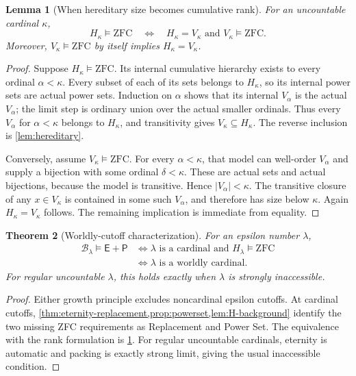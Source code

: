 \documentclass[11pt,letterpaper]{article}
\newtheorem{theorem}{Theorem}[section]
\newtheorem{lemma}[theorem]{Lemma}
\theoremstyle{definition}
\theoremstyle{remark}
\newcommand{\B}{\mathcal B}
\newcommand{\Etern}{\mathsf E}
\newcommand{\Pack}{\mathsf P}
\newcommand{\card}[1]{\lvert#1\rvert}
\begin{document}
\begin{lemma}[When hereditary size becomes cumulative rank]
\label{lem:worldly-HV}
For an uncountable cardinal $\kappa$,
\[
 H_\kappa\models\mathrm{ZFC}
 \quad\Longleftrightarrow\quad
 H_\kappa=V_\kappa\text{ and }V_\kappa\models\mathrm{ZFC}.
\]
Moreover, $V_\kappa\models\mathrm{ZFC}$ by itself implies
$H_\kappa=V_\kappa$.
\end{lemma}
\begin{proof}
Suppose $H_\kappa\models\mathrm{ZFC}$. Its internal cumulative hierarchy
exists to every ordinal $\alpha<\kappa$. Every subset of each of its sets
belongs to $H_\kappa$, so its internal power sets are actual power sets.
Induction on $\alpha$ shows that its internal $V_\alpha$ is the actual
$V_\alpha$; the limit step is ordinary union over the actual smaller
ordinals. Thus every $V_\alpha$ for $\alpha<\kappa$ belongs to $H_\kappa$,
and transitivity gives $V_\kappa\subseteq H_\kappa$.
The reverse inclusion is \cref{lem:hereditary}.

Conversely, assume $V_\kappa\models\mathrm{ZFC}$. For every
$\alpha<\kappa$, that model can well-order $V_\alpha$ and supply a bijection
with some ordinal $\delta<\kappa$. These are actual sets and actual
bijections, because the model is transitive. Hence
$\card{V_\alpha}<\kappa$. The transitive closure of any
$x\in V_\kappa$ is contained in some such $V_\alpha$, and therefore has
size below $\kappa$. Again $H_\kappa=V_\kappa$ follows. The remaining
implication is immediate from equality.
\end{proof}

\begin{theorem}[Worldly-cutoff characterization]
\label{thm:worldly}
For an epsilon number $\lambda$,
\begin{align*}
 \B_\lambda\models\Etern+\Pack
 &\iff \lambda\text{ is a cardinal and }H_\lambda\models\mathrm{ZFC}\\
 &\iff \lambda\text{ is a worldly cardinal}.
\end{align*}
For regular uncountable $\lambda$, this holds exactly when $\lambda$ is
strongly inaccessible.
\end{theorem}
\begin{proof}
Either growth principle excludes noncardinal epsilon cutoffs. At cardinal
cutoffs, \cref{thm:eternity-replacement,prop:powerset,lem:H-background}
identify the two missing ZFC requirements as Replacement and Power Set.
The equivalence with the rank formulation is \cref{lem:worldly-HV}.
For regular uncountable cardinals, eternity is automatic and packing is
exactly strong limit, giving the usual inaccessible condition.
\end{proof}
\end{document}

